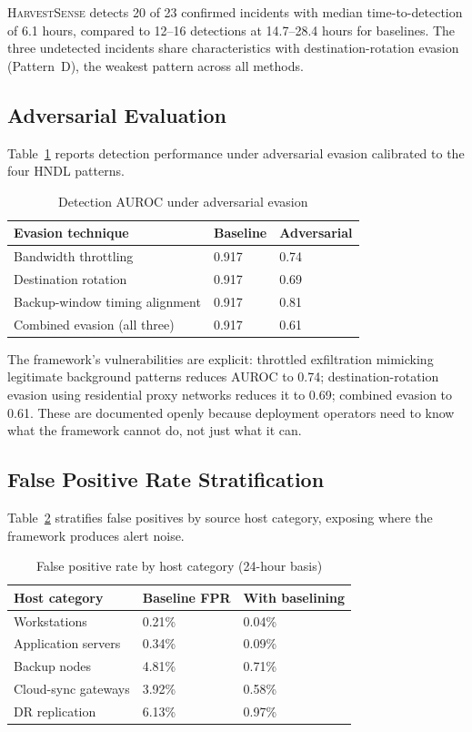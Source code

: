 \documentclass[sigconf,nonacm]{acmart}
\begin{document}
\textsc{HarvestSense} detects 20 of 23 confirmed incidents with median
time-to-detection of 6.1 hours, compared to 12--16 detections at
14.7--28.4 hours for baselines. The three undetected incidents share
characteristics with destination-rotation evasion (Pattern~D), the
weakest pattern across all methods.

\subsection{Adversarial Evaluation}

Table~\ref{tab:adversarial} reports detection performance under
adversarial evasion calibrated to the four HNDL patterns.

\begin{table}[h]
\caption{Detection AUROC under adversarial evasion}
\label{tab:adversarial}
\small
\begin{tabularx}{\columnwidth}{@{}p{3.0cm}X X@{}}
\toprule
\textbf{Evasion technique} & \textbf{Baseline} & \textbf{Adversarial} \\
\midrule
Bandwidth throttling          & 0.917 & 0.74 \\
Destination rotation          & 0.917 & 0.69 \\
Backup-window timing alignment & 0.917 & 0.81 \\
Combined evasion (all three)   & 0.917 & 0.61 \\
\bottomrule
\end{tabularx}
\end{table}

The framework's vulnerabilities are explicit: throttled exfiltration
mimicking legitimate background patterns reduces AUROC to 0.74;
destination-rotation evasion using residential proxy networks reduces
it to 0.69; combined evasion to 0.61. These are documented openly
because deployment operators need to know what the framework cannot
do, not just what it can.

\subsection{False Positive Rate Stratification}

Table~\ref{tab:fpr} stratifies false positives by source host
category, exposing where the framework produces alert noise.

\begin{table}[h]
\caption{False positive rate by host category (24-hour basis)}
\label{tab:fpr}
\small
\begin{tabularx}{\columnwidth}{@{}p{2.6cm}X X@{}}
\toprule
\textbf{Host category} & \textbf{Baseline FPR} & \textbf{With baselining} \\
\midrule
Workstations           & 0.21\% & 0.04\% \\
Application servers    & 0.34\% & 0.09\% \\
Backup nodes           & 4.81\% & 0.71\% \\
Cloud-sync gateways    & 3.92\% & 0.58\% \\
DR replication         & 6.13\% & 0.97\% \\
\bottomrule
\end{tabularx}
\end{table}
\end{document}
